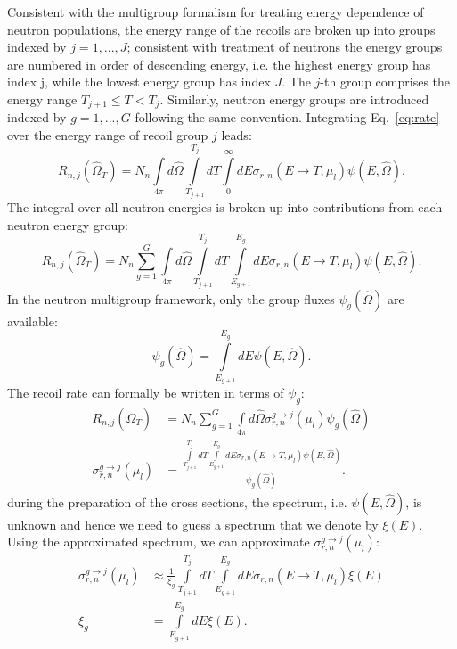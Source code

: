 \documentclass[review]{elsarticle}
\begin{document}
Consistent with the multigroup formalism for treating energy dependence of neutron populations, the energy range of the recoils are broken up into groups indexed by $j=1,...,J$; consistent with treatment of neutrons the energy groups are numbered in order of descending energy, i.e. the highest energy group has index j, while the lowest energy group has index $J$. The $j$-th group comprises the energy range $T_{j+1} \le T < T_j$. Similarly, neutron energy groups are introduced indexed by $g=1,...,G$ following the same convention. Integrating Eq.~\ref{eq:rate} over the energy range of recoil group $j$ leads:
\begin{equation}
  R_{n,j}(\hat{\Omega}_T) =  N_n  \int\limits_{4\pi} d \hat{\Omega} \int\limits_{T_{j+1}}^{T_j} dT \int\limits_0^\infty dE  \sigma_{r,n}(E \rightarrow T, \mu_l) \psi(E, \hat{\Omega}).
\end{equation} 
The integral over all neutron energies is broken up into contributions from each neutron energy group:
\begin{equation}\label{eq:mg_R_1}
  R_{n,j}(\hat{\Omega}_T) =  N_n  \sum\limits_{g=1}^G \int\limits_{4\pi} d \hat{\Omega} \int\limits_{T_{j+1}}^{T_j} dT \int\limits_{E_{g+1}}^{E_g} dE  \sigma_{r,n}(E \rightarrow T, \mu_l) \psi(E, \hat{\Omega}).
\end{equation} 
In the neutron multigroup framework, only the group fluxes $\psi_g(\hat{\Omega})$ are available:
\begin{equation}
  \psi_g(\hat{\Omega}) =  \int\limits_{E_{g+1}}^{E_g} dE \psi(E,\hat{\Omega}).
\end{equation} 
The recoil rate can formally be written in terms of $\psi_g$:
 \begin{align}\label{eq:mg_R_2}
  R_{n,j}(\hat{\Omega}_T) &=  N_n  \sum\limits_{g=1}^G \int\limits_{4\pi} d \hat{\Omega} \sigma_{r,n}^{g \rightarrow j} (\mu_l) \psi_g(\hat{\Omega}) \nonumber \\
  \sigma_{r,n}^{g \rightarrow j} (\mu_l)& = \frac{\int\limits_{T_{j+1}}^{T_j} dT \int\limits_{E_{g+1}}^{E_g} dE  \sigma_{r,n}(E \rightarrow T, \mu_l) \psi(E, \hat{\Omega})}{\psi_g(\hat{\Omega})}.
\end{align} 
during the preparation of the cross sections, the spectrum, i.e. $\psi(E,\hat{\Omega})$, is unknown and hence we need to guess a spectrum that we denote by $\xi(E)$. Using the approximated spectrum, we
can approximate $ \sigma_{r,n}^{g \rightarrow j} (\mu_l)$:
\begin{align}\label{eq:sigma_definition_1}
    \sigma_{r,n}^{g \rightarrow j} (\mu_l)& \approx \frac{1}{\xi_g}\int\limits_{T_{j+1}}^{T_j} dT \int\limits_{E_{g+1}}^{E_g} dE  \sigma_{r,n}(E \rightarrow T, \mu_l) \xi(E) \nonumber \\
     \xi_g &= \int\limits_{E_{g+1}}^{E_g} dE \xi(E).
\end{align}
\end{document}
